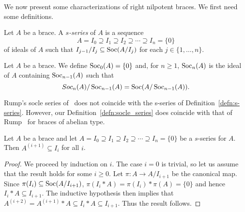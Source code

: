 We now present some characterizations of right nilpotent braces. We first 
need some definitions.  

\begin{definition}
\label{defn:s-series}
    Let $A$ be a brace. A \emph{$s$-series} of $A$ is a sequence
    \[
        A=I_0\supseteq I_1\supseteq I_2\supseteq\cdots\supseteq I_n=\{0\}
    \]
    of ideals of $A$ such that $I_{j-1}/I_j\subseteq \operatorname{Soc}(A/I_j)$ for each
    $j\in\{1,\dots,n\}$.
\end{definition}




\begin{definition}
\label{defn:socle_series}
Let $A$ be a brace. We define
$\operatorname{Soc}_0(A)=\{0\}$ and, for $n\geq 1$, $\operatorname{Soc}_n(A)$ is the ideal of $A$
containing $\operatorname{Soc}_{n-1}(A)$ such that
\[
    Soc_n(A)/\operatorname{Soc}_{n-1}(A)=\operatorname{Soc}(A/\operatorname{Soc}_{n-1}(A)).
\]
\end{definition}

Rump's socle series of~\cite{MR2278047} does not coincide with the s-series of Definition~\ref{defn:s-series}. 
However, our Definition~\ref{defn:socle_series} does coincide with that 
of Rump~\cite{MR2278047} for braces of abelian type. 

\begin{lemma}
    \label{lem:socle_series}
    Let $A$ be a brace and let $A=I_0\supseteq I_1\supseteq
    I_2\supseteq\cdots\supseteq I_n=\{0\}$ be a $s$-series for $A$. Then
    $A^{(i+1)}\subseteq I_i$ for all $i$.
\end{lemma}

\begin{proof}
    We proceed by induction on $i$. The case $i=0$ is trivial, so let us assume
    that the result holds for some $i\geq 0$. Let $\pi\colon A\to A/I_{i+1}$ be the canonical map.
    Since $\pi(I_{i})\subseteq\operatorname{Soc}(A/I_{i+1})$,
    $\pi(I_{i}*A)=\pi(I_{i})*\pi(A)=\{0\}$ and hence $I_{i}*A\subseteq I_{i+1}$.
    The inductive hypothesis then implies that
    $A^{(i+2)}=A^{(i+1)}*A\subseteq I_{i}*A\subseteq I_{i+1}$. Thus
    the result follows.
\end{proof}

